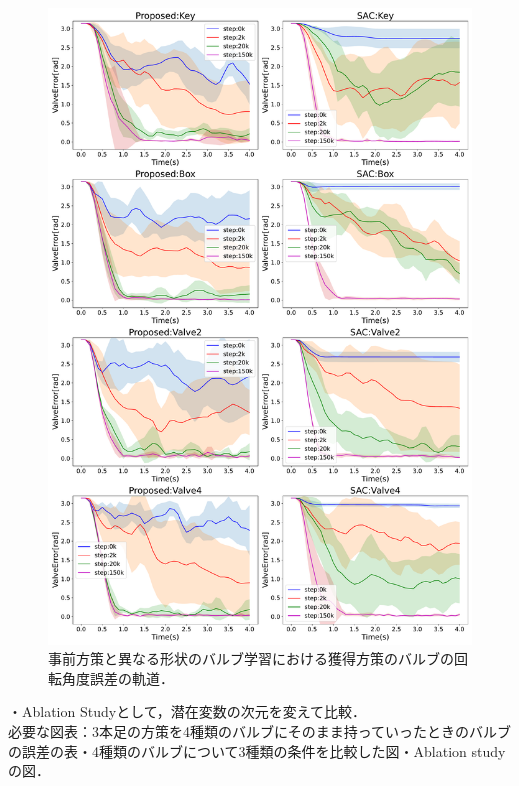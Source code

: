 \documentclass[dvipdfmx]{ampbt_nomag}
\begin{document}
\begin{figure}[htbp]
  \centering
  \includegraphics[width=16cm]
       {asset/img/ValveTrajectory_SimTurn180Other.pdf}
  \caption{事前方策と異なる形状のバルブ学習における獲得方策のバルブの回転角度誤差の軌道．}
  \label{ValveTrajectory_Other_Sim}
\end{figure}
\FloatBarrier












・Ablation Studyとして，潜在変数の次元を変えて比較．\\
必要な図表：3本足の方策を4種類のバルブにそのまま持っていったときのバルブの誤差の表・4種類のバルブについて3種類の条件を比較した図・Ablation studyの図．\\
\end{document}
